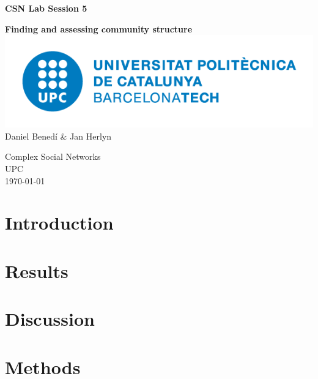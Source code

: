 \documentclass[a4paper,twoside]{article}
\begin{document}
\begin{titlepage}
    \begin{center}
        \vspace*{1cm}
 
        \Huge
        \textbf{CSN Lab Session 5}
        \vspace{1.5cm}

        \LARGE
        \textbf{Finding and assessing community structure}
        \vfill
        \includegraphics[scale = 0.6]{upclogo}
        \vfill
        Daniel Benedí \& Jan Herlyn
        \vspace{0.8cm}
      
        Complex Social Networks\\     
        UPC\\
        \monthyeardate\today
             
    \end{center}
\end{titlepage}

\newpage
    \tableofcontents
\newpage

\section{Introduction}


\section{Results \label{sec:results}}


\section{Discussion\label{sec:discussion}}


\section{Methods \label{sec:methods}}


\newpage
\appendix

\end{document}
